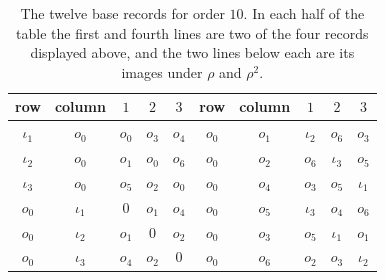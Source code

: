 \documentclass[11pt]{amsart}
\theoremstyle{definition}\newtheorem{definition}[theorem]{Definition}
\theoremstyle{remark}\newtheorem{remark}[theorem]{Remark}
\begin{document}
\begin{table}[ht]
\centering\small
\begin{tabular}{ccccc@{\qquad}ccccc}
\toprule
row & column & $1$ & $2$ & $3$ & row & column & $1$ & $2$ & $3$\\
\midrule
$\iota_1$ & $o_0$ & $o_0$ & $o_3$ & $o_4$ & $o_0$ & $o_1$ & $\iota_2$ & $o_6$ & $o_3$\\
$\iota_2$ & $o_0$ & $o_1$ & $o_0$ & $o_6$ & $o_0$ & $o_2$ & $o_6$ & $\iota_3$ & $o_5$\\
$\iota_3$ & $o_0$ & $o_5$ & $o_2$ & $o_0$ & $o_0$ & $o_4$ & $o_3$ & $o_5$ & $\iota_1$\\
$o_0$ & $\iota_1$ & $0$ & $o_1$ & $o_4$ & $o_0$ & $o_5$ & $\iota_3$ & $o_4$ & $o_6$\\
$o_0$ & $\iota_2$ & $o_1$ & $0$ & $o_2$ & $o_0$ & $o_3$ & $o_5$ & $\iota_1$ & $o_1$\\
$o_0$ & $\iota_3$ & $o_4$ & $o_2$ & $0$ & $o_0$ & $o_6$ & $o_2$ & $o_3$ & $\iota_2$\\
\bottomrule
\end{tabular}
\caption{The twelve base records for order $10$. In each half of the table the first and fourth lines are two of the
four records displayed above, and the two lines below each are its images under $\rho$ and $\rho^2$.}\label{tab:base}
\end{table}
\end{document}

